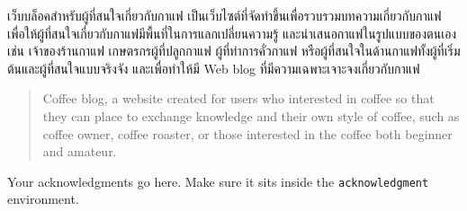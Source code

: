 \maketitle
\makesignature

\ifproject
\begin{abstractTH}
เว็บบล็อคสำหรับผู้ที่สนใจเกี่ยวกับกาแฟ เป็นเว็บไซต์ที่จัดทำขึ้นเพื่อรวบรวมบทความเกี่ยวกับกาแฟ เพื่อให้ผู้ที่สนใจเกี่ยวกับกาแฟมีพื้นที่ในการแลกเปลี่ยนความรู้ และนำเสนอกาแฟในรูปแบบของตนเอง เช่น เจ้าของร้านกาแฟ เกษตรกรผู้ที่ปลูกกาแฟ ผู้ที่ทำการคั่วกาแฟ หรือผู้ที่สนใจในด้านกาแฟทั้งผู้ที่เริ่มต้นและผู้ที่สนใจแบบจริงจัง และเพื่อทำให้มี Web blog ที่มีความเฉพาะเจาะจงเกี่ยวกับกาแฟ 
\end{abstractTH}

\begin{abstract}
Coffee blog, a website created for users who interested in coffee so that they can place to exchange knowledge and their own style of coffee, such as coffee owner, coffee roaster, or those interested in the coffee both beginner and amateur. 
\end{abstract}

\iffalse
\begin{dedication}
This document is dedicated to all Chiang Mai University students.

Dedication page is optional.
\end{dedication}
\fi %

\begin{acknowledgments}
Your acknowledgments go here. Make sure it sits inside the
\texttt{acknowledgment} environment.

\end{acknowledgments}%
\fi %

\contentspage

\ifproject
\figurelistpage

\tablelistpage
\fi %



